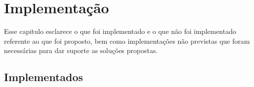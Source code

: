 
\chapter{Implementação}

Esse capitulo esclarece o que foi implementado e o que não foi implementado referente ao que foi proposto, bem como implementações não previstas que foram necessárias para dar suporte as soluções propostas.

\section{Implementados}

